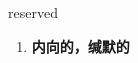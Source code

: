 
\begin{frame}
{\huge reserved}
\begin{center}
\begin{enumerate}\Large
  \item \textbf{内向的，缄默的}
\end{enumerate}
\end{center}
\end{frame}
